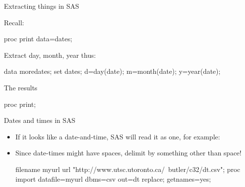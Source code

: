 \documentclass[unknownkeysallowed]{beamer}\usepackage[]{graphicx}\usepackage[]{color}
\begin{document}
\begin{frame}[fragile]{Extracting things in SAS}
  
Recall:

\begin{Sascode}[store=dm]
proc print data=dates;
\end{Sascode}



Extract day, month, year thus:

\begin{Datastep}
data moredates;
  set dates;
  d=day(date);
  m=month(date);
  y=year(date);
\end{Datastep}


\end{frame}

\begin{frame}[fragile]{The results}

\begin{Sascode}[store=dn]
proc print;  
\end{Sascode}


  
  
\end{frame}

\begin{frame}[fragile]{Dates and times in SAS}

  \begin{itemize}
    
\item If it looks like a date-and-time, SAS will read it as one, for example:
  
  
  
\item Since date-times might have spaces, delimit by something other
  than space!

\begin{Datastep}
filename myurl url 
  "http://www.utsc.utoronto.ca/~butler/c32/dt.csv";  
proc import
  datafile=myurl
    dbms=csv
    out=dt
    replace;
  getnames=yes;
\end{Datastep}
    

  

\end{itemize}
  
\end{frame}
\end{document}

